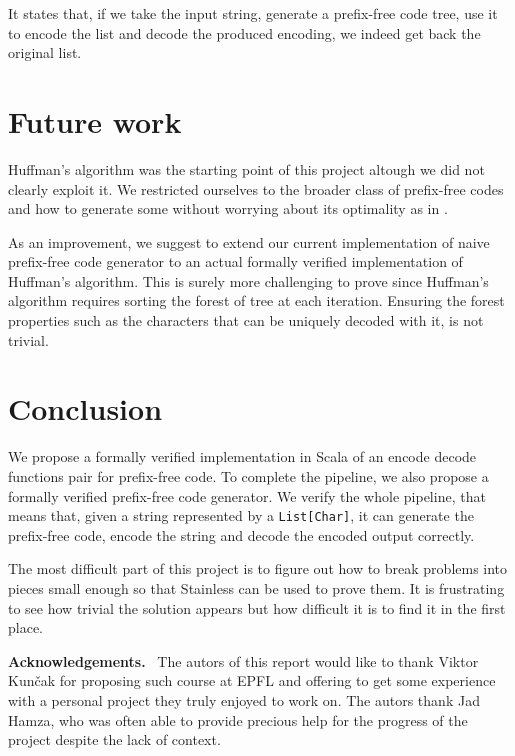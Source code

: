 \documentclass[a4paper,UKenglish,cleveref, autoref, thm-restate]{lipics-v2021}
\begin{document}
It states that, if we take the input string, generate a prefix-free code tree, use it to encode the list and decode the produced encoding, we indeed get back the original list.

\section{Future work}

Huffman's algorithm was the starting point of this project altough we did not clearly exploit it. We restricted ourselves to the broader class of prefix-free codes and how to generate some without worrying about its optimality as in \cite{blanchette}. 

As an improvement, we suggest to extend our current implementation of naive prefix-free code generator to an actual formally verified implementation of Huffman's algorithm. This is surely more challenging to prove since Huffman's algorithm requires sorting the forest of tree at each iteration. Ensuring the forest properties such as the characters that can be uniquely decoded with it, is not trivial.

\section{Conclusion}
We propose a formally verified implementation in Scala of an encode decode functions pair for prefix-free code. To complete the pipeline, we also propose a formally verified prefix-free code generator.
We verify the whole pipeline, that means that, given a string represented by a \lstinline{List[Char]}, it can generate the prefix-free code, encode the string and decode the encoded output correctly.

The most difficult part of this project is to figure out how to break problems into pieces small enough so that Stainless can be used to prove them. 
It is frustrating to see how trivial the solution appears but how difficult it is to find it in the first place.

\vspace{0.5cm} %
\noindent %
\textbf{\large Acknowledgements.}\ %
The autors of this report would like to thank Viktor Kun\v{c}ak for proposing such course at EPFL and offering to get some experience with a personal project they truly enjoyed to work on. The autors thank Jad Hamza, who was often able to provide precious help for the progress of the project despite the lack of context.


\end{document}
